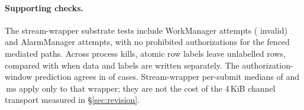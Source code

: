 \paragraph{Supporting checks.} The stream-wrapper substrate tests include \subWorkManagerLogged{} WorkManager attempts (\subWorkManagerInvalid{} invalid) and \subAlarmManagerLogged{} AlarmManager attempts, with no prohibited authorizations for the fenced mediated paths. Across \crashKills{} process kills, atomic row labels leave \crashOrphA{} unlabelled rows, compared with \crashOrphB{} when data and labels are written separately. The authorization-window prediction agrees in \predAgree{} of \predN{} cases. Stream-wrapper per-submit medians of \eeNoneMs{} and \eeRdMs{}\,ms apply only to that wrapper; they are not the cost of the 4\,KiB channel transport measured in \S\ref{sec:revision}.
